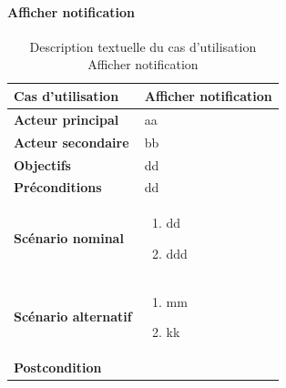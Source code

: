         \paragraph[Afficher notification]{Afficher notification}
        \begin{longtable}{p{4cm} p{9cm}}
            \caption{Description textuelle du cas d’utilisation Afficher notification}
            \label{table:usecaseAfficherNotification}
            \\\hline\hline
                \textbf{Cas d’utilisation} & \textbf{Afficher notification}
            \\\hline\hline
                    \textbf{Acteur principal} & aa
                \\
                    \textbf{Acteur secondaire} & bb
                \\
                    \textbf{Objectifs} & dd
                \\
                    \textbf{Préconditions} & dd
                \\
                \textbf{Scénario nominal} &
                    \begin{enumerate}[leftmargin=*]
                        \item dd
                        \item ddd
                    \end{enumerate}
                \\
                \textbf{Scénario alternatif} &
                    \begin{enumerate}[leftmargin=*]
                        \item mm
                        \item kk
                    \end{enumerate}
                \\
                \textbf{Postcondition}
            \\\bottomrule
        \end{longtable}

